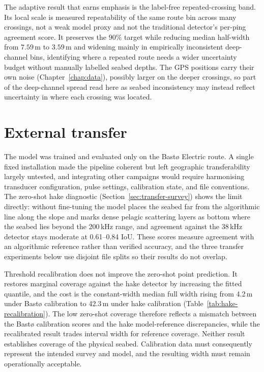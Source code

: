 The adaptive result that earns emphasis is the label-free repeated-crossing band. Its local scale is measured repeatability of the same route bin across many crossings, not a weak model proxy and not the traditional detector's per-ping agreement score. It preserves the $90\%$ target while reducing median half-width from $7.59$\,m to $3.59$\,m and widening mainly in empirically inconsistent deep-channel bins, identifying where a repeated route needs a wider uncertainty budget without manually labelled seabed depths. The GPS positions carry their own noise (Chapter~\ref{chap:data}), possibly larger on the deeper crossings, so part of the deep-channel spread read here as seabed inconsistency may instead reflect uncertainty in where each crossing was located.

\section{External transfer}
\label{sec:generalise-beyond}
The model was trained and evaluated only on the Bast\o{} Electric route. A single fixed installation made the pipeline coherent but left geographic transferability largely untested, and integrating other campaigns would require harmonising transducer configuration, pulse settings, calibration state, and file conventions. The zero-shot hake diagnostic (Section~\ref{sec:transfer-survey}) shows the limit directly: without fine-tuning the model places the seabed far from the algorithmic line along the slope and marks dense pelagic scattering layers as bottom where the seabed lies beyond the 200\,kHz range, and agreement against the 38\,kHz detector stays moderate at 0.61--0.84 IoU. These scores measure agreement with an algorithmic reference rather than verified accuracy, and the three transfer experiments below use disjoint file splits so their results do not overlap.

Threshold recalibration does not improve the zero-shot point prediction. It restores marginal coverage against the hake detector by increasing the fitted quantile, and the cost is the constant-width median full width rising from 4.2\,m under Bast\o{} calibration to 42.3\,m under hake calibration (Table~\ref{tab:hake-recalibration}). The low zero-shot coverage therefore reflects a mismatch between the Bast\o{} calibration scores and the hake model-reference discrepancies, while the recalibrated result trades interval width for reference coverage. Neither result establishes coverage of the physical seabed. Calibration data must consequently represent the intended survey and model, and the resulting width must remain operationally acceptable.

